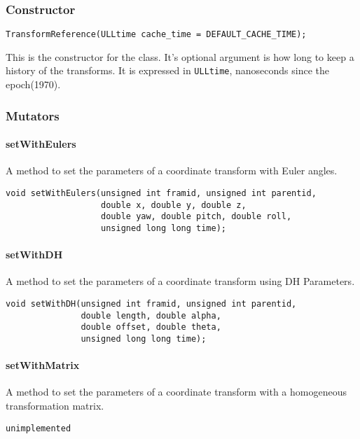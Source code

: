 \documentclass[12pt]{article}
\begin{document}
\subsubsection{Constructor}
\begin{verbatim}
TransformReference(ULLtime cache_time = DEFAULT_CACHE_TIME);
\end{verbatim}
This is the constructor for the class.  It's optional argument is 
how long to keep a history of the transforms.  It is expressed in 
\texttt{ULLtime}, nanoseconds since the epoch(1970).  

\subsubsection{Mutators}

\paragraph{setWithEulers}
A method to set the parameters of a coordinate transform with Euler angles. 
\begin{verbatim}
void setWithEulers(unsigned int framid, unsigned int parentid, 
                   double x, double y, double z, 
                   double yaw, double pitch, double roll, 
                   unsigned long long time);
\end{verbatim}

\paragraph{setWithDH}
A method to set the parameters of a coordinate transform using DH Parameters. 
\begin{verbatim} 
void setWithDH(unsigned int framid, unsigned int parentid, 
               double length, double alpha, 
               double offset, double theta, 
               unsigned long long time);
\end{verbatim}



\paragraph{setWithMatrix}
A method to set the parameters of a coordinate transform with a homogeneous transformation matrix. 
\begin{verbatim}
unimplemented
\end{verbatim}
\end{document}

